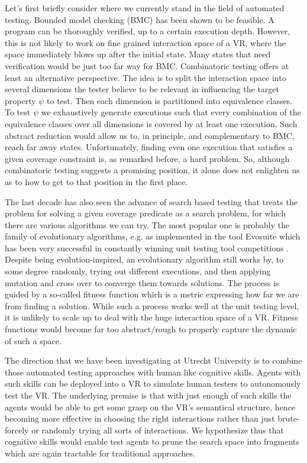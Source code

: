 \documentclass[sigplan]{acmart}\settopmatter{printfolios=false,printccs=false,printacmref=false}
\begin{document}
Let's first briefly consider where we currently stand in the field of automated testing. Bounded
model checking (BMC) \cite{biere2003bounded} has been shown to be feasible. A program can be thoroughly
verified, up to a certain execution depth. However, this is not likely to work on fine grained interaction space
of a VR, where the space immediately blows up after the initial state. Many states
that need verification would be just too far way for BMC. 
Combinatoric testing \cite{nie2011survey} offers at least an alternative perspective. The idea is to split the interaction space into
several dimensions the tester believe to be relevant in influencing the target
property $\psi$ to test. Then each dimension is partitioned into equivalence classes.
To test $\psi$ we exhaustively generate executions such that every combination of the equivalence
classes over all dimensions is covered by at least one execution. Such abstract reduction
would allow us to, in principle, and complementary to BMC, reach far away states. Unfortunately, finding
even one execution that satisfies a given coverage constraint is, as remarked before,
a hard problem. So, although combinatoric testing suggests a promising position, it alone
does not enlighten us as to how to get to that position in the first place.

The last decade has also seen the advance of search based testing \cite{mcminn2004search} that treats
the problem for solving a given coverage predicate as a search problem, for which
there are various algorithms we can try. The most popular one is probably the family of evolutionary algorithms,
e.g. as implemented in the tool Evosuite \cite{fraser2011evosuite} which has been very successful in
constantly winning unit testing tool competitions \cite{SBST2015Contest}. Despite being evolution-inspired, 
an evolutionary algorithm still works by, to some degree randomly, trying out different
executions, and then applying mutation and cross over to converge them towards 
solutions. The process is guided by a so-called fitness function which is a metric
expressing how far we are from finding a solution. While such a process works well at the unit testing
level, it is unlikely to scale up to deal with the huge interaction space of a VR.
Fitness functions would become far too abstract/rough to properly capture the dynamic of such a space.

The direction that we have been investigating at Utrecht University is to 
combine those automated testing approaches with human like cognitive skills. Agents with such skills 
can be deployed into a VR to simulate human testers to autonomously test the VR. The underlying
premise is that with just enough of such skills the agents would be able 
to get some grasp on the VR's semantical structure, hence becoming more effective in choosing the right interactions rather than just brute-forcely or randomly trying all sorts of interactions. 
We hypothesize thus that cognitive skills would enable test agents 
to prune the search space into fragments which are again tractable for traditional approaches.
\end{document}
